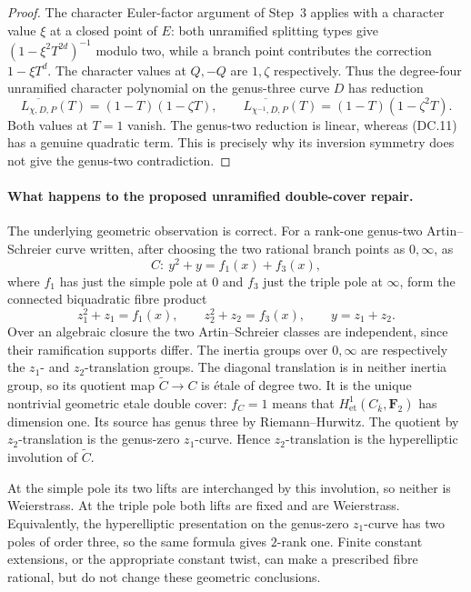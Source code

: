 \begin{proof}
The character Euler-factor argument of Step~3 applies
with a character value $\xi$ at a closed point of $E$:
both unramified splitting types give
$(1-\xi^2T^{2d})^{-1}$ modulo two, while a branch point
contributes the correction $1-\xi T^d$.
The character values at $Q,-Q$ are $1,\zeta$ respectively.
Thus the degree-four unramified character polynomial on
the genus-three curve $D$ has reduction
\[
       \overline{L_{\chi,D,P}}(T)=(1-T)(1-\zeta T),
       \qquad
       \overline{L_{\chi^{-1},D,P}}(T)
                                      =(1-T)(1-\zeta^2T).
\tag{DC.11}
\]
Both values at $T=1$ vanish.  The genus-two reduction is
linear, whereas (DC.11) has a genuine quadratic term.
This is precisely why its inversion symmetry does not
give the genus-two contradiction.
\end{proof}

\paragraph{What happens to the proposed unramified double-cover repair.}
The underlying geometric observation is correct.
For a rank-one genus-two Artin--Schreier curve written,
after choosing the two rational branch points as $0,\infty$,
as
\[
 C:\ y^2+y=f_1(x)+f_3(x),
\]
where $f_1$ has just the simple pole at $0$ and $f_3$
just the triple pole at $\infty$, form the connected
biquadratic fibre product
\[
 z_1^2+z_1=f_1(x),\qquad z_2^2+z_2=f_3(x),
                         \qquad y=z_1+z_2.
\tag{DC.12}
\]
Over an algebraic closure the two Artin--Schreier classes
are independent, since their ramification supports differ.
The inertia groups over $0,\infty$ are respectively the
$z_1$- and $z_2$-translation groups.
The diagonal translation is in neither inertia group,
so its quotient map $\widetilde C\to C$ is \'etale of
degree two.  It is the unique nontrivial geometric etale
double cover: $f_C=1$ means that
$H^1_{\mathrm{et}}(C_{\bar k},\mathbf F_2)$ has dimension one.
Its source has genus three by Riemann--Hurwitz.
The quotient by $z_2$-translation is
the genus-zero $z_1$-curve.  Hence $z_2$-translation is
the hyperelliptic involution of $\widetilde C$.

At the simple pole its two lifts are interchanged by
this involution, so neither is Weierstrass.  At the
triple pole both lifts are fixed and are Weierstrass.
Equivalently, the hyperelliptic presentation on the
genus-zero $z_1$-curve has two poles of order three,
so the same formula gives $2$-rank one.
Finite constant extensions, or the appropriate constant
twist, can make a prescribed fibre rational, but do not
change these geometric conclusions.

